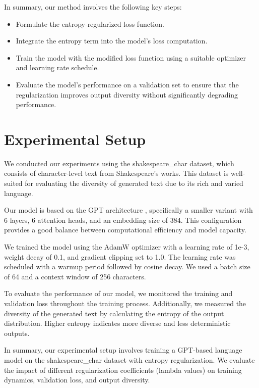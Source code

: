 \documentclass{article} %
\begin{document}
In summary, our method involves the following key steps:
\begin{itemize}
    \item Formulate the entropy-regularized loss function.
    \item Integrate the entropy term into the model's loss computation.
    \item Train the model with the modified loss function using a suitable optimizer and learning rate schedule.
    \item Evaluate the model's performance on a validation set to ensure that the regularization improves output diversity without significantly degrading performance.
\end{itemize}

\section{Experimental Setup}
\label{sec:experimental}

We conducted our experiments using the shakespeare\_char dataset, which consists of character-level text from Shakespeare's works. This dataset is well-suited for evaluating the diversity of generated text due to its rich and varied language.

Our model is based on the GPT architecture \citep{radford2019language}, specifically a smaller variant with 6 layers, 6 attention heads, and an embedding size of 384. This configuration provides a good balance between computational efficiency and model capacity.

We trained the model using the AdamW optimizer \citep{loshchilov2017adamw} with a learning rate of 1e-3, weight decay of 0.1, and gradient clipping set to 1.0. The learning rate was scheduled with a warmup period followed by cosine decay. We used a batch size of 64 and a context window of 256 characters.

To evaluate the performance of our model, we monitored the training and validation loss throughout the training process. Additionally, we measured the diversity of the generated text by calculating the entropy of the output distribution. Higher entropy indicates more diverse and less deterministic outputs.

In summary, our experimental setup involves training a GPT-based language model on the shakespeare\_char dataset with entropy regularization. We evaluate the impact of different regularization coefficients (lambda values) on training dynamics, validation loss, and output diversity.
\end{document}
